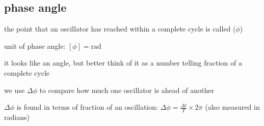 \subsection{phase angle}
the point that an oscillator has reached within a complete cycle is called  ($\phi$)

\cmt unit of phase angle: $[\phi] = \text{rad}$

it looks like an angle, but better think of it as a number telling fraction of a complete cycle

\cmt we use  $\Delta\phi$ to compare how much one oscillator is ahead of another

$\Delta\phi$ is found in terms of fraction of an oscillation: $\Delta\phi = \frac{\Delta t}{T} \times 2\pi $ (also measured in radians)



%
%

